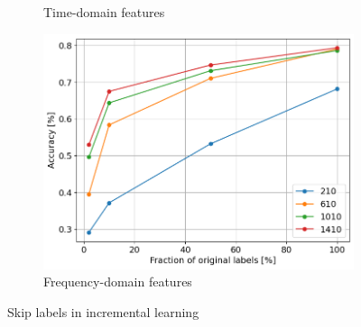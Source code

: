 \begin{figure}[h]
\begin{subfigure}[b]{0.48\textwidth}
        \caption{Time-domain features}
    \end{subfigure}
    \hfill
    \begin{subfigure}[b]{0.48\textwidth}
        \includegraphics[width=\textwidth]{assets/results/incremental-learning/skip-labels-FD.png}
        \caption{Frequency-domain features}
    \end{subfigure} 
    \caption{Skip labels in incremental learning}
\end{figure}


